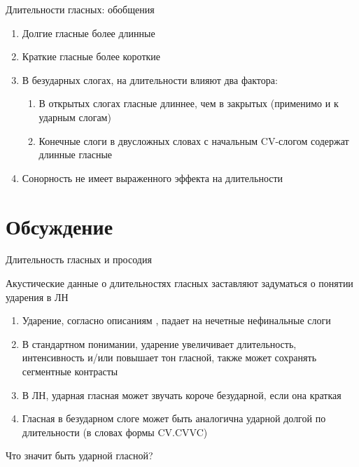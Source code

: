 \documentclass[10 pt, handout]{beamer}
\begin{document}
\begin{frame}{Длительности гласных: обобщения}

	\begin{enumerate}[\ding{166}]
		\item Долгие гласные более длинные
		\item Краткие гласные более короткие
		\item В безударных слогах, на длительности влияют два фактора:
			\vspace*{-1em}
			\begin{enumerate}[\ding{167}]
				\item В открытых слогах гласные длиннее, чем в закрытых (применимо и к ударным слогам)
				\item Конечные слоги в двусложных словах с начальным CV-слогом содержат длинные гласные
			\end{enumerate}
		\item Сонорность не имеет выраженного эффекта на длительности
	\end{enumerate}

\end{frame}

	\section{Обсуждение}

\begin{frame}{Длительность гласных и просодия}

	Акустические данные о длительностях гласных заставляют задуматься о понятии ударения в ЛН
	\vspace*{1em}
	
	\begin{enumerate}[\ding{36}]
		\item Ударение, согласно описаниям \parencite{sammallahti1974, salminen2007}, падает на нечетные нефинальные слоги
		\item В стандартном понимании, ударение увеличивает длительность, интенсивность и/или повышает тон гласной, также может сохранять сегментные контрасты
		\item В ЛН, ударная гласная может звучать короче безударной, если она краткая
		\item Гласная в безударном слоге может быть аналогична ударной долгой по длительности (в словах формы CV.CVVC)
	\end{enumerate}
	
	\vspace*{1em}
	Что значит быть ударной гласной?

\end{frame}
\end{document}
